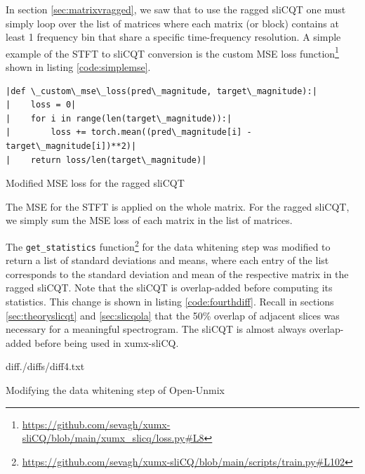 \documentclass[report.tex]{subfiles}
\begin{document}
In section \ref{sec:matrixvragged}, we saw that to use the ragged sliCQT one must simply loop over the list of matrices where each matrix (or block) contains at least 1 frequency bin that share a specific time-frequency resolution. A simple example of the STFT to sliCQT conversion is the custom MSE loss function\footnote{\url{https://github.com/sevagh/xumx-sliCQ/blob/main/xumx_slicq/loss.py\#L8}} shown in listing \ref{code:simplemse}.

\begin{listing}[h]
  \centering
\begin{verbatim}
|def \_custom\_mse\_loss(pred\_magnitude, target\_magnitude):|
|    loss = 0|
|    for i in range(len(target\_magnitude)):|
|        loss += torch.mean((pred\_magnitude[i] - target\_magnitude[i])**2)|
|    return loss/len(target\_magnitude)|
\end{verbatim}
  \caption{Modified MSE loss for the ragged sliCQT}
  \label{code:simplemse}
\end{listing}

The MSE for the STFT is applied on the whole matrix. For the ragged sliCQT, we simply sum the MSE loss of each matrix in the list of matrices.

The \Verb#get_statistics# function\footnote{\url{https://github.com/sevagh/xumx-sliCQ/blob/main/scripts/train.py\#L102}} for the data whitening step was modified to return a list of standard deviations and means, where each entry of the list corresponds to the standard deviation and mean of the respective matrix in the ragged sliCQT. Note that the sliCQT is overlap-added before computing its statistics. This change is shown in listing \ref{code:fourthdiff}. Recall in sections \ref{sec:theoryslicqt} and \ref{sec:slicqola} that the 50\% overlap of adjacent slices was necessary for a meaningful spectrogram. The sliCQT is almost always overlap-added before being used in xumx-sliCQ.

\begin{listing}[ht]
  \centering
\begin{inputminted}[linenos,breaklines,frame=single,fontsize=\scriptsize]{diff}{./diffs/diff4.txt}
\end{inputminted}
  \caption{Modifying the data whitening step of Open-Unmix}
  \label{code:fourthdiff}
\end{listing}
\end{document}
